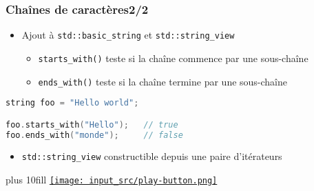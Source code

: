 \documentclass[C++.tex]{subfiles}
\begin{document}
\begin{frame}[fragile]
	\frametitle{Chaînes de caractères\titlehfill{}2/2}
	\begin{itemize}
		\item Ajout à \lstinline|std::basic_string| et \lstinline|std::string_view|
		\begin{itemize}
			\item \lstinline|starts_with()| teste si la chaîne commence par une sous-chaîne
			\item \lstinline|ends_with()| teste si la chaîne termine par une sous-chaîne
		\end{itemize}
	\end{itemize}

	\begin{lstlisting}[language=C++]
string foo = "Hello world";

foo.starts_with("Hello");   // true
foo.ends_with("monde");     // false\end{lstlisting}

	\begin{itemize}
		\item \lstinline|std::string_view| constructible depuis une paire d'itérateurs
	\end{itemize}

	\vskip 10mm plus 10fill
	\hfill
	\href{https://godbolt.org/#g:!((g:!((g:!((h:codeEditor,i:(filename:'1',fontScale:14,fontUsePx:'0',j:1,lang:c%2B%2B,selection:(endColumn:1,endLineNumber:12,positionColumn:1,positionLineNumber:12,selectionStartColumn:1,selectionStartLineNumber:12,startColumn:1,startLineNumber:12),source:'%23include+%3Cstring%3E%0A%23include+%3Ciostream%3E%0A%0Aint+main()%0A%7B%0A++std::string+foo+%3D+%22Hello+world%22%3B%0A%0A++std::cout+%3C%3C+std::boolalpha%3B%0A++std::cout+%3C%3C+foo.starts_with(%22Hello%22)+%3C%3C+%22%5Cn%22%3B%0A++std::cout+%3C%3C+foo.ends_with(%22monde%22)+%3C%3C+%22%5Cn%22%3B%0A%7D%0A'),l:'5',n:'0',o:'C%2B%2B+source+%231',t:'0')),k:50,l:'4',n:'0',o:'',s:0,t:'0'),(g:!((h:executor,i:(argsPanelShown:'1',compilationPanelShown:'0',compiler:g112,compilerOutShown:'0',execArgs:'',execStdin:'',fontScale:14,fontUsePx:'0',j:1,lang:c%2B%2B,libs:!((name:boost,ver:'175')),options:'-std%3Dc%2B%2B20',source:1,stdinPanelShown:'1',tree:'1',wrap:'0'),l:'5',n:'0',o:'Executor+x86-64+gcc+11.2+(C%2B%2B,+Editor+%231)',t:'0')),header:(),k:50,l:'4',n:'0',o:'',s:0,t:'0')),l:'2',n:'0',o:'',t:'0')),version:4}{\texttt{[image: input\_src/play-button.png]}}
\end{frame}
\end{document}
